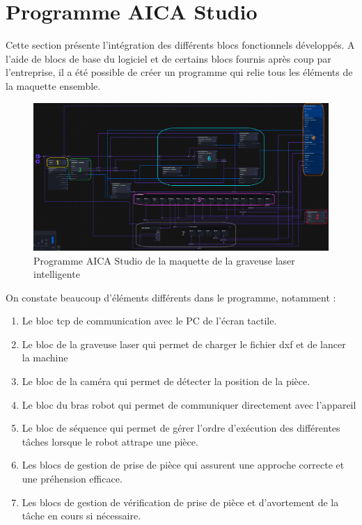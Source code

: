 \clearpage
\section{Programme AICA Studio}

Cette section présente l'intégration des différents blocs fonctionnels développés. A l'aide de blocs de base du logiciel et de certains blocs fournis après coup par l'entreprise, il a été possible de créer un programme qui relie tous les éléments de la maquette ensemble.

\begin{figure}[H]
    \centering
    \includegraphics[width=1\textwidth]{assets/figures/AICA_PROG.png}
    \caption{Programme AICA Studio de la maquette de la graveuse laser intelligente}
    \label{fig:aica_programme}
\end{figure}

On constate beaucoup d'éléments différents dans le programme, notamment :

\begin{enumerate}
    \item Le bloc \gls{tcp} de communication avec le PC de l'écran tactile.
    \item Le bloc de la graveuse laser qui permet de charger le fichier \gls{dxf} et de lancer la machine
    \item Le bloc de la caméra qui permet de détecter la position de la pièce.
    \item Le bloc du bras robot qui permet de communiquer directement avec l'appareil
    \item Le bloc de séquence qui permet de gérer l'ordre d'exécution des différentes tâches lorsque le robot attrape une pièce.
    \item Les blocs de gestion de prise de pièce qui assurent une approche correcte et une préhension efficace.
    \item Les blocs de gestion de vérification de prise de pièce et d'avortement de la tâche en cours si nécessaire.
\end{enumerate}

